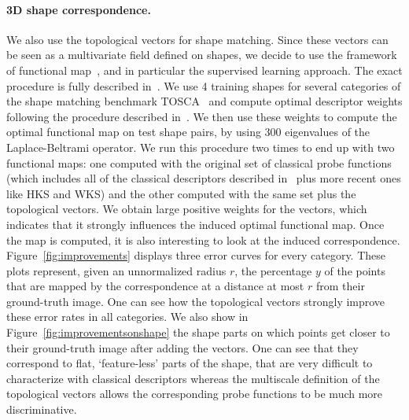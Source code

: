 \paragraph*{3D shape correspondence.}
We also use the topological vectors for shape matching. 
Since these vectors can be seen as a multivariate field defined on shapes, we decide to
use the framework of functional map~\cite{Ovsjanikov12}, and in particular the supervised learning approach.
The exact procedure is fully described in~\cite{Corman14}.
We use 4 training shapes for several categories of the shape matching
benchmark TOSCA~\cite{Bronstein08} and compute optimal descriptor
weights following the procedure described in~\cite{Corman14}. We then
use these weights to compute the optimal functional map on test shape
pairs, by using 300 eigenvalues of the Laplace-Beltrami operator. 
%
We run this procedure two times to end up with
two functional maps: one computed with the original set of classical probe functions (which includes all of the classical descriptors
described in~\cite{Kalogerakis10} plus more recent ones like HKS and WKS) and the other computed with the same set plus the 
topological vectors. We obtain large positive weights for the vectors, which indicates that it strongly influences the induced optimal functional map.
Once the map is computed, it is also interesting to look at the induced correspondence. Figure~\ref{fig:improvements} displays three
error curves for every category. These plots represent, given an unnormalized radius $r$, the percentage $y$ of the points that are mapped by the correspondence 
at a distance at most $r$ from their ground-truth image. One can see how the topological vectors strongly improve these error rates in all categories.
We also show in Figure~\ref{fig:improvementsonshape} the shape parts on which points get closer to their
ground-truth image after adding the vectors.
One can see that they correspond to flat, `feature-less' parts of the shape, that are very difficult to characterize 
with classical descriptors whereas the multiscale definition of the topological vectors allows the corresponding 
probe functions to be much more discriminative.



